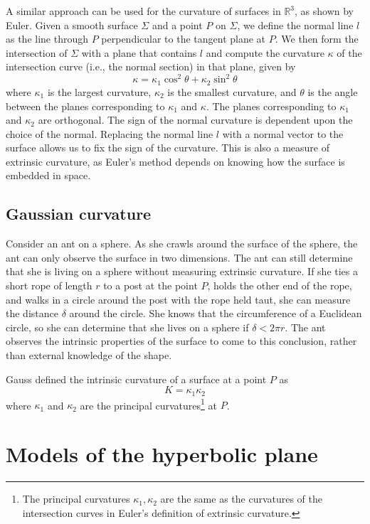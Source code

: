\documentclass[letterpaper,titlepage]{article}
\begin{document}
A similar approach can be used for the curvature of surfaces in $\mathbb{R}^3$, as shown by Euler.
Given a smooth surface $\Sigma$ and a point $P$ on $\Sigma$, we define the normal line $l$ as the line through $P$ perpendicular to the tangent plane at $P$.
We then form the intersection of $\Sigma$ with a plane that contains $l$ and compute the curvature $\kappa$ of the intersection curve (i.e., the normal section) in that plane, given by
\[ \kappa = \kappa_1 \cos^2 \theta + \kappa_2 \sin^2 \theta \]
where $\kappa_1$ is the largest curvature, $\kappa_2$ is the smallest curvature, and $\theta$ is the angle between the planes corresponding to $\kappa_1$ and $\kappa$.
The planes corresponding to $\kappa_1$ and $\kappa_2$ are orthogonal.
The sign of the normal curvature is dependent upon the choice of the normal.
Replacing the normal line $l$ with a normal vector to the surface allows us to fix the sign of the curvature.\cite{singer}
This is also a measure of extrinsic curvature, as Euler's method depends on knowing how the surface is embedded in space.\cite{adventures}

\subsection{Gaussian curvature}
Consider an ant on a sphere.
As she crawls around the surface of the sphere, the ant can only observe the surface in two dimensions.
The ant can still determine that she is living on a sphere without measuring extrinsic curvature.
If she ties a short rope of length $r$ to a post at the point $P$, holds the other end of the rope, and walks in a circle around the post with the rope held taut, she can measure the distance $\delta$ around the circle.
She knows that the circumference of a Euclidean circle, so she can determine that she lives on a sphere if $\delta < 2\pi r$.\cite{adventures}
The ant observes the intrinsic properties of the surface to come to this conclusion, rather than external knowledge of the shape.

Gauss defined the intrinsic curvature of a surface at a point $P$ as
\[ K = \kappa_1\kappa_2 \]
where $\kappa_1$ and $\kappa_2$ are the principal curvatures\footnote{The principal curvatures $\kappa_1,\kappa_2$ are the same as the curvatures of the intersection curves in Euler's definition of extrinsic curvature.} at $P$.

\section{Models of the hyperbolic plane}
\end{document}
